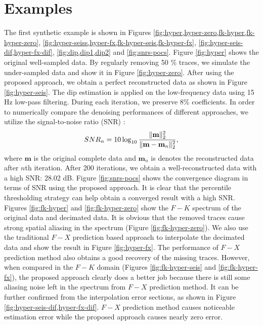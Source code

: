 \section{Examples}
The first synthetic example is shown in Figures \ref{fig:hyper,hyper-zero,fk-hyper,fk-hyper-zero}, \ref{fig:hyper-seiss,hyper-fx,fk-hyper-seis,fk-hyper-fx}, \ref{fig:hyper-seis-dif,hyper-fx-dif}, \ref{fig:dip,dip1,dip2} and \ref{fig:snrs-pocs}. Figure \ref{fig:hyper} shows the original well-sampled data. By regularly removing 50 \% traces, we simulate the under-sampled data and show it in Figure \ref{fig:hyper-zero}. After using the proposed approach, we obtain a perfect reconstructed data as shown in Figure \ref{fig:hyper-seis}. The dip estimation is applied on the low-frequency data using 15 Hz low-pass filtering. During each iteration, we preserve 8\% coefficients. In order to numerically compare the denoising performances of different approaches,  we utilize the signal-to-noise ratio (SNR) \cite{yangkang2015}:
\begin{equation}
\label{eq:snr}
SNR_n=10\log_{10}\frac{\Arrowvert \mathbf{m} \Arrowvert_2^2}{\Arrowvert \mathbf{m}-\mathbf{m}_n\Arrowvert_2^2},
\end{equation}
where $\mathbf{m}$ is the original complete data and $\mathbf{m}_n$ is denotes the reconstructed data after $n$th iteration.
After 200 iterations, we obtain a well-reconstructed data with a high SNR: 28.02 dB. Figure \ref{fig:snrs-pocs} shows the convergence diagram in terms of SNR using the proposed approach. It is clear that the percentile thresholding strategy can help obtain a converged result with a high SNR. Figures \ref{fig:fk-hyper} and \ref{fig:fk-hyper-zero} show the $F-K$ spectrum of the original data and decimated data. It is obvious that the removed traces cause strong spatial aliasing in the spectrum (Figure \ref{fig:fk-hyper-zero}). We also use the traditional $F-X$ prediction based approach \cite{spitz1991} to interpolate the decimated data and show the result in Figure \ref{fig:hyper-fx}. The performance of $F-X$ prediction method also obtains a good recovery of the missing traces. However, when compared in the $F-K$ domain (Figures \ref{fig:fk-hyper-seis} and \ref{fig:fk-hyper-fx}), the proposed approach clearly does a better job because there is still some aliasing noise left in the spectrum from $F-X$ prediction method. It can be further confirmed from the interpolation error sections, as shown in Figure \ref{fig:hyper-seis-dif,hyper-fx-dif}. $F-X$ prediction method causes noticeable estimation error while the proposed approach causes nearly zero error. 


